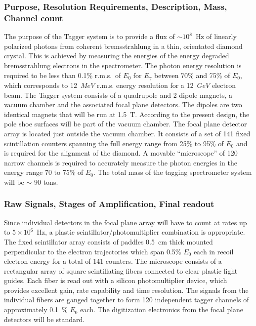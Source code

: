\subsubsection*{Purpose, Resolution Requirements, Description, Mass, Channel count}
The purpose of the Tagger system is to provide a flux of $\sim 10^{8}$~Hz
of linearly polarized photons from coherent bremsstrahlung in a thin,
orientated diamond crystal. This is achieved by measuring the energies
of the energy degraded bremsstrahlung electrons in the spectrometer.
The photon energy resolution is required to be less than 0.1\% r.m.s.\
of $E_{0}$ for $E_{\gamma}$ between 70\% and 75\%  of $E_{0}$, which
corresponds to 12~$MeV$ r.m.s. energy resolution for a 12~$GeV$ electron beam. 
The Tagger system consists of a quadrupole and 2 dipole magnets, 
a vacuum chamber and the associated focal plane detectors. The dipoles
are two identical magnets that will be run at 1.5~T.  According to the
present design, the pole shoe surfaces will be part of the vacuum chamber.
The focal plane detector array is located just outside the vacuum chamber.
It consists of a set of 141 fixed scintillation counters spanning the full
energy range from 25\% to 95\% of $E_{0}$ and is required for the alignment
of the diamond. A movable ``microscope'' of 120 narrow channels is required
to accurately measure the photon energies in the energy  range 70 to 75\%
of $E_{0}$.  The total mass of the tagging spectrometer system will be
$\sim$ 90 tons.  

\subsubsection*{Raw Signals, Stages of Amplification, Final readout}

Since individual detectors in the focal plane array will have to count
at rates up to $5\times 10^{6}$~Hz, a plastic scintillator/photomultiplier
combination is appropriate.  The fixed scintillator array consists of
paddles 0.5~cm thick mounted perpendicular to the electron trajectories
which span 0.5\% $E_0$ each in recoil electron energy for a total of 141
counters.  The microscope consists of a rectangular array of square
scintillating fibers connected to clear plastic light guides.  Each
fiber is read out with a silicon photomultiplier device, which provides
excellent gain, rate capability and time resolution.  The signals from
the individual fibers are ganged together to form 120 independent tagger
channels of approximately 0.1~\% $E_0$ each.  The digitization electronics
from the focal plane detectors will be standard.


